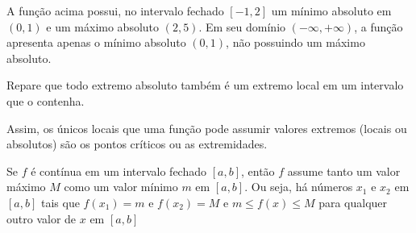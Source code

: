 \begin{figure}[H]
	\centering
\end{figure}
A função acima possui, no intervalo fechado $[-1,2]$ um mínimo absoluto em $(0,1)$ e um máximo absoluto $(2,5)$. Em seu domínio $(-\infty,+\infty)$, a função apresenta apenas o mínimo absoluto $(0,1)$, não possuindo um máximo absoluto. \par 
Repare que todo extremo absoluto também é um extremo local em um intervalo que o contenha. \par 
Assim, os únicos locais que uma função pode assumir valores extremos (locais ou absolutos) são os pontos críticos ou as extremidades.
\begin{teo}
Se $f$ é contínua em um intervalo fechado $[a,b]$, então $f$ assume tanto um valor máximo $M$ como um valor mínimo $m$ em $[a,b]$. Ou seja, há números $x_1$ e $x_2$ em $[a,b]$ tais que $f(x_1)=m$ e $f(x_2)=M$ e $m \le f(x) \le M$ para qualquer outro valor de $x$ em $[a,b]$
\end{teo}

